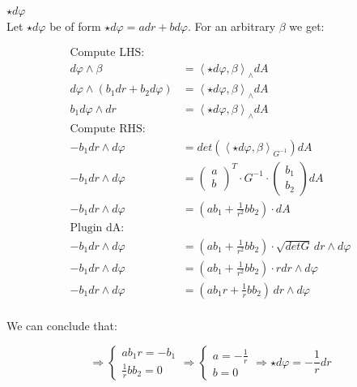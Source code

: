 \documentclass{article}
\begin{document}
\newpage
\begin{center}
	$\boxed{\star d\varphi}$\\
	\vspace{1em}
	Let $\star d\varphi$ be of form $\star d\varphi = a dr + b d\varphi$. For an arbitrary $\beta$ we get:
\end{center}

\begin{align*}
	\text{Compute LHS:}\\
	d\varphi \wedge \beta &= \left\langle \star d\varphi, \beta \right\rangle_\wedge dA\\
	d\varphi \wedge (b_1dr+b_2d\varphi) &= \left\langle \star d\varphi, \beta \right\rangle_\wedge dA\\
	b_1 d\varphi \wedge dr &= \left\langle \star d\varphi, \beta \right\rangle_\wedge dA\\
	\text{Compute RHS:}\\
	-b_1 dr \wedge d\varphi &= det(\left\langle \star d\varphi, \beta \right\rangle_{G^{-1}}) dA\\
	-b_1 dr \wedge d\varphi &= \begin{pmatrix}
								a\\
								b	
							  \end{pmatrix}^T\cdot G^{-1}\cdot \begin{pmatrix}
								b_1\\
								b_2	
								\end{pmatrix}dA\\
	-b_1 dr \wedge d\varphi &= (ab_1 + \frac{1}{r^2}bb_2) \cdot dA\\
	\text{Plugin dA:}\\
	-b_1 dr \wedge d\varphi &= (ab_1 + \frac{1}{r^2}bb_2) \cdot \sqrt{det G} \, dr \wedge d\varphi\\
	-b_1 dr \wedge d\varphi &= (ab_1 + \frac{1}{r^2}bb_2) \cdot r dr \wedge d\varphi\\
	-b_1 dr \wedge d\varphi &= (ab_1r + \frac{1}{r}bb_2)\, dr \wedge d\varphi\\
\end{align*}
\begin{center}
	We can conclude that:
\end{center}
\begin{equation*}
	\Rightarrow \begin{cases}
		ab_1r = -b_1\\
		\frac{1}{r}bb_2 = 0
	\end{cases} \Rightarrow \begin{cases}
		a = -\frac{1}{r}\\
		b = 0
	\end{cases} \Rightarrow \boxed{\star d\varphi = -\frac{1}{r} dr}
\end{equation*}
\end{document}
